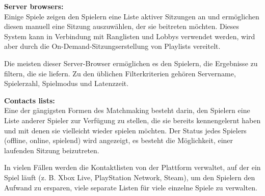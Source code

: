 \cite{Wikipedia.2021b}

\textbf{Server browsers:} \\
Einige Spiele zeigen den Spielern eine Liste aktiver Sitzungen an und ermöglichen diesen manuell eine Sitzung auszuwählen, der sie beitreten möchten. Dieses System kann in Verbindung mit Ranglisten und Lobbys verwendet werden, wird aber durch die On-Demand-Sitzungserstellung von Playlists vereitelt.

Die meisten dieser Server-Browser ermöglichen es den Spielern, die Ergebnisse zu filtern, die sie liefern. Zu den üblichen Filterkriterien gehören Servername, Spielerzahl, Spielmodus und Latenzzeit. 

\cite{Wikipedia.2021b}

\textbf{Contacts lists:} \\
Eine der gängigsten Formen des Matchmaking besteht darin, den Spielern eine Liste anderer Spieler zur Verfügung zu stellen, die sie bereits kennengelernt haben und mit denen sie vielleicht wieder spielen möchten. Der Status jedes Spielers (offline, online, spielend) wird angezeigt, es besteht die Möglichkeit, einer laufenden Sitzung beizutreten.

In vielen Fällen werden die Kontaktlisten von der Plattform verwaltet, auf der ein Spiel läuft (z. B. Xbox Live, PlayStation Network, Steam), um den Spielern den Aufwand zu ersparen, viele separate Listen für viele einzelne Spiele zu verwalten. \cite{Wikipedia.2021b}
